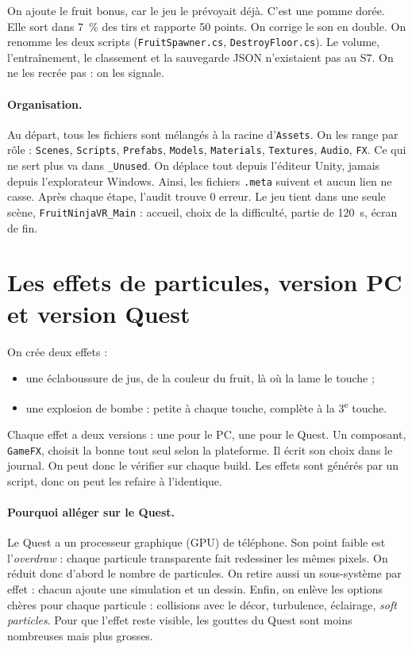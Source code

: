 \documentclass[11pt,a4paper]{article}
\newcommand{\fichier}[1]{\texttt{\small #1}}
\begin{document}
On ajoute le fruit bonus, car le jeu le prévoyait déjà. C'est une pomme dorée. Elle sort dans 7~\% des
tirs et rapporte 50 points. On corrige le son en double. On renomme les deux scripts
(\fichier{FruitSpawner.cs}, \fichier{DestroyFloor.cs}). Le volume, l'entraînement, le classement et la
sauvegarde JSON n'existaient pas au S7. On ne les recrée pas : on les signale.

\paragraph{Organisation.} Au départ, tous les fichiers sont mélangés à la racine d'\texttt{Assets}. On
les range par rôle : \texttt{Scenes}, \texttt{Scripts}, \texttt{Prefabs}, \texttt{Models},
\texttt{Materials}, \texttt{Textures}, \texttt{Audio}, \texttt{FX}. Ce qui ne sert plus va dans
\texttt{\_Unused}. On déplace tout depuis l'éditeur Unity, jamais depuis l'explorateur Windows. Ainsi,
les fichiers \texttt{.meta} suivent et aucun lien ne casse. Après chaque étape, l'audit trouve
0 erreur. Le jeu tient dans une seule scène, \texttt{FruitNinjaVR\_Main} : accueil, choix de la
difficulté, partie de 120~s, écran de fin.

\section{Les effets de particules, version PC et version Quest}

On crée deux effets :
\begin{itemize}
\item une éclaboussure de jus, de la couleur du fruit, là où la lame le touche ;
\item une explosion de bombe : petite à chaque touche, complète à la 3\textsuperscript{e} touche.
\end{itemize}

Chaque effet a deux versions : une pour le PC, une pour le Quest. Un composant, \texttt{GameFX}, choisit
la bonne tout seul selon la plateforme. Il écrit son choix dans le journal. On peut donc le vérifier
sur chaque build. Les effets sont générés par un script, donc on peut les refaire à l'identique.

\paragraph{Pourquoi alléger sur le Quest.} Le Quest a un processeur graphique (GPU) de téléphone. Son
point faible est l'\emph{overdraw} : chaque particule transparente fait redessiner les mêmes pixels. On
réduit donc d'abord le nombre de particules. On retire aussi un sous-système par effet : chacun ajoute
une simulation et un dessin. Enfin, on enlève les options chères pour chaque particule : collisions
avec le décor, turbulence, éclairage, \emph{soft particles}. Pour que l'effet reste visible, les
gouttes du Quest sont moins nombreuses mais plus grosses.
\end{document}

